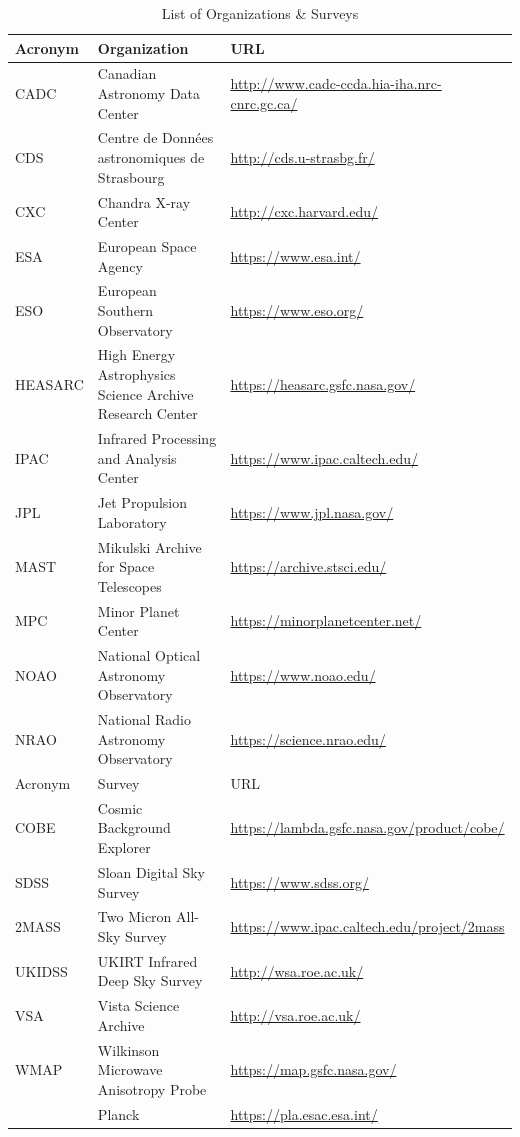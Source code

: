 \documentclass[twocolumn]{aastex62}
\begin{document}
\begin{table}[htp]
\centering
\caption{List of Organizations \& Surveys}
\begin{tabular}{lll}
\label{tab:surveys}
    Acronym & Organization & URL \\
\hline
    CADC & Canadian Astronomy Data Center & \url{http://www.cadc-ccda.hia-iha.nrc-cnrc.gc.ca/} \\
    CDS & Centre de Données astronomiques de Strasbourg & \url{http://cds.u-strasbg.fr/} \\
    CXC & Chandra X-ray Center & \url{http://cxc.harvard.edu/} \\
    ESA & European Space Agency & \url{https://www.esa.int/} \\
    ESO & European Southern Observatory & \url{https://www.eso.org/} \\
    HEASARC & High Energy Astrophysics Science Archive Research Center & \url{https://heasarc.gsfc.nasa.gov/} \\
    IPAC & Infrared Processing and Analysis Center & \url{https://www.ipac.caltech.edu/} \\
    JPL & Jet Propulsion Laboratory & \url{https://www.jpl.nasa.gov/} \\
    MAST & Mikulski Archive for Space Telescopes & \url{https://archive.stsci.edu/} \\
    MPC & Minor Planet Center & \url{https://minorplanetcenter.net/} \\
    NOAO & National Optical Astronomy Observatory & \url{https://www.noao.edu/} \\
    NRAO & National Radio Astronomy Observatory & \url{https://science.nrao.edu/} \\
\hline
\hline
    Acronym & Survey & URL \\
\hline
    COBE & Cosmic Background Explorer & \url{https://lambda.gsfc.nasa.gov/product/cobe/}\\
    SDSS & Sloan Digital Sky Survey & \url{https://www.sdss.org/} \\
    2MASS & Two Micron All-Sky Survey & \url{https://www.ipac.caltech.edu/project/2mass} \\
    UKIDSS & UKIRT Infrared Deep Sky Survey & \url{http://wsa.roe.ac.uk/}\\
    VSA & Vista Science Archive & \url{http://vsa.roe.ac.uk/}\\
    WMAP & Wilkinson Microwave Anisotropy Probe & \url{https://map.gsfc.nasa.gov/}\\
    & Planck & \url{https://pla.esac.esa.int/}\\
\end{tabular}


\par 
\end{table}
\end{document}
